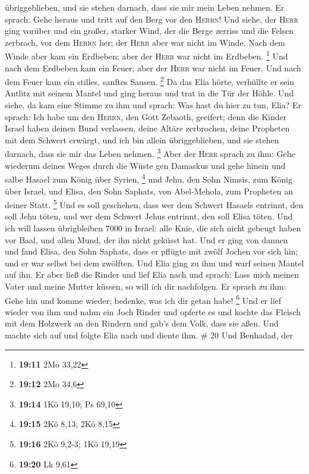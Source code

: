 übriggeblieben, und sie stehen darnach, dass sie mir mein Leben nehmen.
 Er sprach: Gehe heraus und tritt auf den Berg vor den
\textsc{Herrn}! Und siehe, der \textsc{Herr} ging vorüber und ein
großer, starker Wind, der die Berge zerriss und die Felsen zerbrach, vor
dem \textsc{Herrn} her; der \textsc{Herr} aber war nicht im Winde. Nach
dem Winde aber kam ein Erdbeben; aber der \textsc{Herr} war nicht im
Erdbeben. \footnote{\textbf{19:11} 2Mo 33,22}  Und nach
dem Erdbeben kam ein Feuer; aber der \textsc{Herr} war nicht im Feuer.
Und nach dem Feuer kam ein stilles, sanftes Sausen. \footnote{\textbf{19:12}
  2Mo 34,6}  Da das Elia hörte, verhüllte er sein Antlitz
mit seinem Mantel und ging heraus und trat in die Tür der Höhle. Und
siehe, da kam eine Stimme zu ihm und sprach: Was hast du hier zu tun,
Elia?  Er sprach: Ich habe um den \textsc{Herrn}, den
Gott Zebaoth, geeifert; denn die Kinder Israel haben deinen Bund
verlassen, deine Altäre zerbrochen, deine Propheten mit dem Schwert
erwürgt, und ich bin allein übriggeblieben, und sie stehen darnach, dass
sie mir das Leben nehmen. \footnote{\textbf{19:14} 1Kö 19,10; Ps 69,10}
 Aber der \textsc{Herr} sprach zu ihm: Gehe wiederum
deines Weges durch die Wüste gen Damaskus und gehe hinein und salbe
Hasael zum König über Syrien, \footnote{\textbf{19:15} 2Kö 8,13; 2Kö
  8,15}  und Jehu, den Sohn Nimsis, zum König über
Israel, und Elisa, den Sohn Saphats, von Abel-Mehola, zum Propheten an
deiner Statt. \footnote{\textbf{19:16} 2Kö 9,2-3; 1Kö 19,19}
 Und es soll geschehen, dass wer dem Schwert Hasaels
entrinnt, den soll Jehu töten, und wer dem Schwert Jehus entrinnt, den
soll Elisa töten.  Und ich will lassen übrigbleiben 7000
in Israel: alle Knie, die sich nicht gebeugt haben vor Baal, und allen
Mund, der ihn nicht geküsst hat.  Und er ging von dannen
und fand Elisa, den Sohn Saphats, dass er pflügte mit zwölf Jochen vor
sich hin; und er war selbst bei dem zwölften. Und Elia ging zu ihm und
warf seinen Mantel auf ihn.  Er aber ließ die Rinder und
lief Elia nach und sprach: Lass mich meinen Vater und meine Mutter
küssen, so will ich dir nachfolgen. Er sprach zu ihm: Gehe hin und komme
wieder; bedenke, was ich dir getan habe! \footnote{\textbf{19:20} Lk
  9,61}  Und er lief wieder von ihm und nahm ein Joch
Rinder und opferte es und kochte das Fleisch mit dem Holzwerk an den
Rindern und gab's dem Volk, dass sie aßen. Und machte sich auf und
folgte Elia nach und diente ihm. \# 20  Und Benhadad, der
